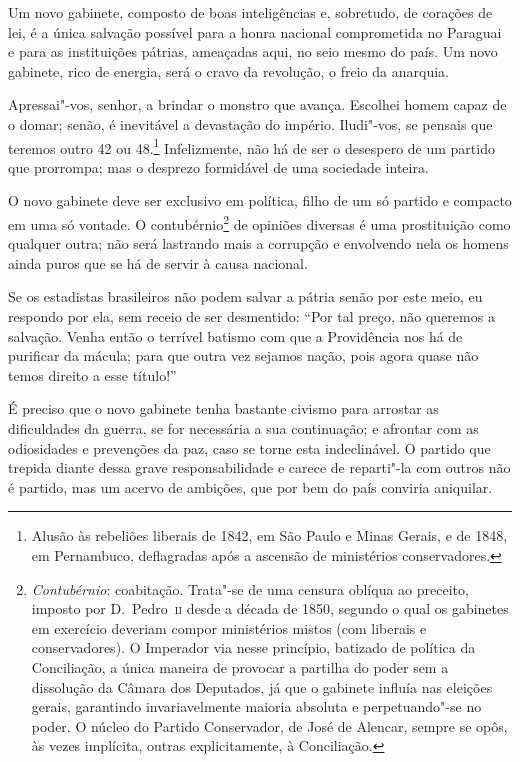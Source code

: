  Um novo gabinete, composto de boas inteligências e, sobretudo, de
corações de lei, é a única salvação possível para a honra nacional
comprometida no Paraguai e para as instituições pátrias, ameaçadas
aqui, no seio mesmo do país. Um novo gabinete, rico de energia, será o
cravo da revolução, o freio da anarquia.

 Apressai"-vos, senhor, a brindar o monstro que avança. Escolhei homem
capaz de o domar; senão, é inevitável a devastação do império.
Iludi"-vos, se pensais que teremos outro 42 ou
48.\footnote{ Alusão às rebeliões liberais de 1842, em São Paulo 
e Minas Gerais, e de 1848, em Pernambuco, deflagradas após a ascensão de ministérios conservadores.}
 Infelizmente, não há de ser o desespero de um partido que prorrompa;
mas o desprezo formidável de uma sociedade inteira.

 O novo gabinete deve ser exclusivo em política, filho de um só partido
e compacto em uma só vontade. O
contubérnio\footnote{ \textit{Contubérnio}: coabitação. Trata"-se de uma censura oblíqua ao preceito,
imposto por D.~Pedro~\textsc{ii} desde a década de 1850, segundo o qual os
gabinetes em exercício deveriam compor ministérios mistos (com liberais
e conservadores). O Imperador via nesse princípio, batizado de política
da Conciliação, a única maneira de provocar a partilha do poder sem a
dissolução da Câmara dos Deputados, já que o gabinete influía nas
eleições gerais, garantindo invariavelmente maioria absoluta e
perpetuando"-se no poder. O núcleo do Partido Conservador, de José de
Alencar, sempre se opôs, às vezes implícita, outras explicitamente, à
Conciliação.}
 de opiniões diversas é uma prostituição como qualquer outra; não será
lastrando mais a corrupção e envolvendo nela os homens ainda puros que
se há de servir à causa nacional. 

 Se os estadistas brasileiros não podem salvar a pátria senão por este
meio, eu respondo por ela, sem receio de ser desmentido: ``Por tal
preço, não queremos a salvação. Venha então o terrível batismo com que
a Providência nos há de purificar da mácula; para que outra vez sejamos
nação, pois agora quase não temos direito a esse título!''

 É preciso que o novo gabinete tenha bastante civismo para arrostar as
dificuldades da guerra, se for necessária a sua continuação; e afrontar
com as odiosidades e prevenções da paz, caso se torne esta
indeclinável. O partido que trepida diante dessa grave responsabilidade
e carece de reparti"-la com outros não é partido, mas um acervo de
ambições, que por bem do país conviria aniquilar.


